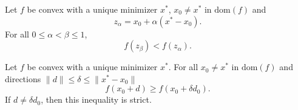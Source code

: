 \documentclass[10pt,a4paper]{amsart}
\begin{document}
\begin{lemma}
\label{lemma_strictly_decreasing}
Let $f$ be convex with a unique minimizer $x^{\ast}$, $x_{0} \ne x^{\ast}$ in $\mathrm{dom}(f)$ and
\begin{equation*}
z_{\alpha} = x_{0} + \alpha ( x^{\ast} - x_{0}).
\end{equation*}
For all $0 \le \alpha < \beta \le 1$,
\begin{equation*}
f(z_{\beta}) < f(z_{\alpha}).
\end{equation*}
\end{lemma}

\begin{theorem}
\label{theorem_optimal_direction}
Let $f$ be convex with a unique minimizer $x^{\ast}$.
For all $x_{0} \ne x^{\ast}$ in $\mathrm{dom}(f)$ and directions $\lVert d \rVert \le \delta \le \lVert x^{\ast} - x_{0} \rVert$
\begin{equation*}
f(x_{0} + d) \ge f(x_{0} + \delta d_{0}).
\end{equation*}
If $d \ne \delta d_{0}$, then this inequality is strict.
\end{theorem}
\end{document}

